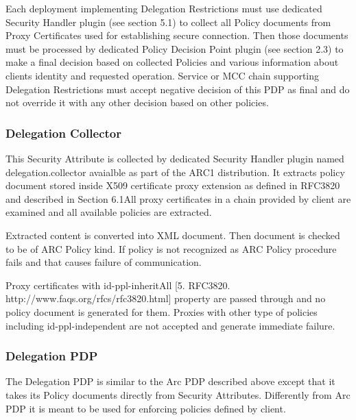 \documentclass{article}
\begin{document}
{\upshape\color{black}
Each deployment implementing Delegation Restrictions must use dedicated
Security Handler plugin (see section 5.1) to collect all Policy
documents from Proxy Certificates used for establishing secure
connection. Then those documents must be processed by dedicated Policy
Decision Point plugin (see section 2.3) to make a final decision based
on collected Policies and various information about
client{\textquotesingle}s identity and requested operation. Service or
MCC chain supporting Delegation Restrictions must accept negative
decision of this PDP as final and do not override it with any other
decision based on other policies.}

\subsubsection[Delegation Collector]{Delegation Collector}
\label{bkm:Ref204009734}{\upshape\color{black}
This Security Attribute is collected by dedicated Security Handler
plugin named {\textquotedbl}delegation.collector{\textquotedbl}
avaialble as part of the ARC1 distribution. It extracts policy document
stored inside X509 certificate proxy extension as defined in RFC3820
and described in Section 6.1All proxy certificates in a chain provided
by client are examined and all available policies are extracted. }

{\upshape\color{black}
Extracted content is converted into XML document. Then document is
checked to be of ARC Policy kind. If policy is not recognized as ARC
Policy procedure fails and that causes failure of communication.}

{\upshape\color{black}
Proxy certificates with id-ppl-inheritAll [5. RFC3820.
http://www.faqs.org/rfcs/rfc3820.html] property are passed through and
no policy document is generated for them. Proxies with other type of
policies including id-ppl-independent are not accepted and generate
immediate failure.}

\subsubsection[Delegation PDP]{Delegation PDP}
\label{bkm:Ref204009695}{\upshape\color{black}
The Delegation PDP is similar to the Arc PDP described above except that
it takes it{\textquotesingle}s Policy documents directly from Security
Attributes. Differently from Arc PDP it is meant to be used for
enforcing policies defined by client.}
\end{document}
